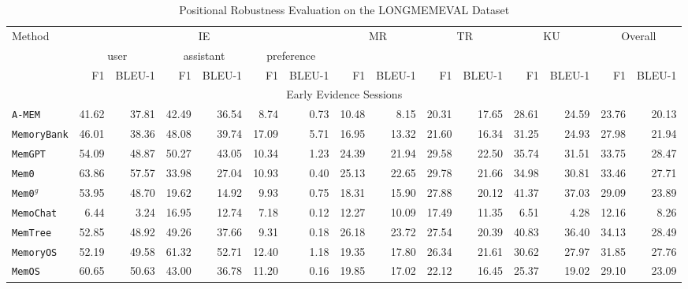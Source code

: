 \begin{table}[]
\centering
\caption{Positional Robustness Evaluation on the LONGMEMEVAL Dataset}
\small
\begin{tabular}{l|r|r|r|r|r|r|r|r|r|r|r|r|r|r}
\toprule
\multirow{3}{*}{Method} & \multicolumn{6}{c|}{IE} & \multicolumn{2}{c|}{\multirow{2}{*}{MR}} & \multicolumn{2}{c|}{\multirow{2}{*}{TR}} & \multicolumn{2}{c|}{\multirow{2}{*}{KU}} & \multicolumn{2}{c}{\multirow{2}{*}{Overall}}\\ \cline{2-7}
 & \multicolumn{2}{c|}{user}  & \multicolumn{2}{c|}{assistant} & \multicolumn{2}{c|}{preference} & \multicolumn{2}{c|}{} & \multicolumn{2}{c|}{} & \multicolumn{2}{c|}{} & \multicolumn{2}{c}{} \\ \cline{2-15}
 & F1 &  BLEU-1 & F1  & BLEU-1  & F1 & BLEU-1 & F1 & BLEU-1 & F1 & BLEU-1 & F1 & BLEU-1 & F1 & BLEU-1 \\ \midrule
 \multicolumn{15}{c}{Early Evidence Sessions}\\ \midrule
{\tt A-MEM} & 41.62 & 37.81 & 42.49 & 36.54 & 8.74 & 0.73 & 10.48 & 8.15 & 20.31 & 17.65 & 28.61 & 24.59  &23.76 &20.13\\ 
{\tt MemoryBank}  & 46.01 & 38.36 & 48.08 & 39.74 & 17.09 & 5.71 & 16.95 & 13.32 & 21.60 & 16.34 & 31.25 & 24.93  &27.98 &21.94\\
{\tt MemGPT} & 54.09& 48.87& 50.27& 43.05& 10.34& 1.23& 24.39& 21.94& 29.58& 22.50& 35.74& 31.51  &33.75 &28.47\\
{\tt Mem0} & 63.86 & 57.57 & 33.98 & 27.04 & 10.93 & 0.40 & 25.13 & 22.65 & 29.78 & 21.66 & 34.98 & 30.81  &33.46 &27.71\\
{\tt Mem0$^g$} & 53.95 & 48.70 & 19.62 & 14.92 & 9.93 & 0.75 & 18.31 & 15.90 & 27.88 & 20.12 & 41.37 & 37.03  &29.09 &23.89\\
{\tt MemoChat} &6.44 &3.24 &16.95 &12.74 &7.18 &0.12 &12.27 &10.09 &17.49 &11.35 &6.51 &4.28  &12.16 &8.26\\ 
{\tt MemTree} &52.85 &48.92 &49.26 &37.66 &9.31 &0.18 &26.18 &23.72 &27.54 &20.39 &40.83 &36.40  &34.13 &28.49\\ 
{\tt MemoryOS} &52.19 &49.58 &61.32 &52.71 &12.40 &1.18 &19.35 &17.80 &26.34 &21.61 &30.62 &27.97  &31.85 &27.76\\ 
{\tt MemOS}  &60.65 &50.63 &43.00 &36.78 &11.20 &0.16 &19.85 &17.02 &22.12 &16.45 &25.37 &19.02 &29.10 &23.09\\   \midrule



\end{tabular}
\end{table}

